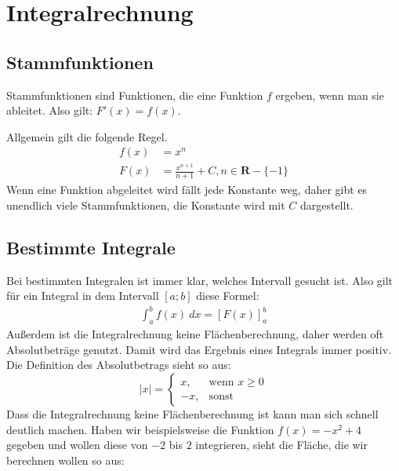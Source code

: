 \chapter{Integralrechnung}

\section{Stammfunktionen}

\begin{flushleft}
    Stammfunktionen sind Funktionen, die eine Funktion $f$ ergeben, wenn man sie ableitet.
    Also gilt: $F'(x)=f(x)$.

    Allgemein gilt die folgende Regel.
    \begin{align}
        f(x)&=x^n \\
        F(x)&=\frac{x^{n+1}}{n+1}+C, n \in \mathbf{R} - \{-1\}
    \end{align}
    Wenn eine Funktion abgeleitet wird fällt jede Konstante weg, daher gibt es unendlich viele Stammfunktionen, die Konstante wird mit $C$ dargestellt.
\end{flushleft}

\section{Bestimmte Integrale}

\begin{flushleft}
    Bei bestimmten Integralen ist immer klar, welches Intervall gesucht ist.
    Also gilt für ein Integral in dem Intervall $[a;b]$ diese Formel:
    \begin{align}
        \int_{a}^{b} f(x) \ dx = [F(x)]_{a}^{b}
    \end{align}
    Außerdem ist die Integralrechnung keine Flächenberechnung, daher werden oft Absolutbeträge genutzt. Damit wird das Ergebnis eines Integrals immer positiv.
    Die Definition des Absolutbetrags sieht so aus:
    \[
        \mid x \mid =
        \begin{cases}
            x, &\text{wenn } x \geq 0 \\
            -x, &\text{sonst}
        \end{cases}
    \]
    Dass die Integralrechnung keine Flächenberechnung ist kann man sich schnell deutlich machen.
    Haben wir beispielsweise die Funktion $f(x)=-x^2+4$ gegeben und wollen diese von $-2$ bis $2$ integrieren, sieht die Fläche, die wir berechnen wollen so aus:
\end{flushleft}

